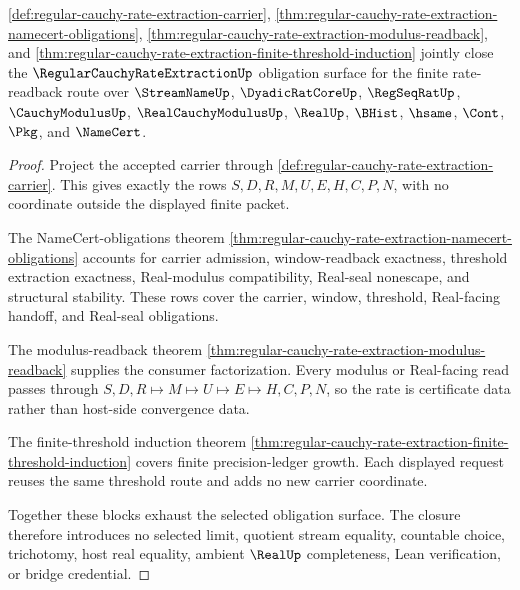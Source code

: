 \begin{theorem}
\label{thm:regular-cauchy-rate-extraction-obligation-closure}
\autoref{def:regular-cauchy-rate-extraction-carrier}, \autoref{thm:regular-cauchy-rate-extraction-namecert-obligations}, \autoref{thm:regular-cauchy-rate-extraction-modulus-readback}, and \autoref{thm:regular-cauchy-rate-extraction-finite-threshold-induction} jointly close the $\RegularCauchyRateExtractionUp$ obligation surface for the finite rate-readback route over $\StreamNameUp$, $\DyadicRatCoreUp$, $\RegSeqRatUp$, $\CauchyModulusUp$, $\RealCauchyModulusUp$, $\RealUp$, $\BHist$, $\hsame$, $\Cont$, $\Pkg$, and $\NameCert$.
\end{theorem}
\begin{proof}
Project the accepted carrier through \autoref{def:regular-cauchy-rate-extraction-carrier}. This gives exactly the rows $S,D,R,M,U,E,H,C,P,N$, with no coordinate outside the displayed finite packet.

The NameCert-obligations theorem \autoref{thm:regular-cauchy-rate-extraction-namecert-obligations} accounts for carrier admission, window-readback exactness, threshold extraction exactness, Real-modulus compatibility, Real-seal nonescape, and structural stability. These rows cover the carrier, window, threshold, Real-facing handoff, and Real-seal obligations.

The modulus-readback theorem \autoref{thm:regular-cauchy-rate-extraction-modulus-readback} supplies the consumer factorization. Every modulus or Real-facing read passes through $S,D,R \mapsto M \mapsto U \mapsto E \mapsto H,C,P,N$, so the rate is certificate data rather than host-side convergence data.

The finite-threshold induction theorem \autoref{thm:regular-cauchy-rate-extraction-finite-threshold-induction} covers finite precision-ledger growth. Each displayed request reuses the same threshold route and adds no new carrier coordinate.

Together these blocks exhaust the selected obligation surface. The closure therefore introduces no selected limit, quotient stream equality, countable choice, trichotomy, host real equality, ambient $\RealUp$ completeness, Lean verification, or bridge credential.
\end{proof}


